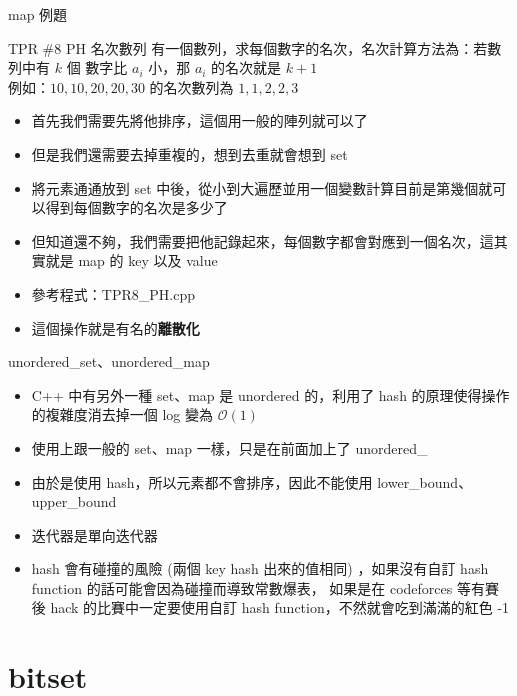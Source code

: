 \documentclass[aspectratio=169]{beamer}
\begin{document}
    
    \begin{frame}{map 例題}
        \begin{block}{TPR \#8 PH 名次數列}
            有一個數列，求每個數字的名次，名次計算方法為：若數列中有 $k$ 個 數字比 $a_i$ 小，那 $a_i$ 的名次就是 $k + 1$\\
            例如：${10, 10, 20, 20, 30}$ 的名次數列為 $1, 1, 2, 2, 3$
        \end{block}

        \begin{itemize}
            \item<2-> 首先我們需要先將他排序，這個用一般的陣列就可以了
            \item<3-> 但是我們還需要去掉重複的，想到去重就會想到 set
            \item<4-> 將元素通通放到 set 中後，從小到大遍歷並用一個變數計算目前是第幾個就可以得到每個數字的名次是多少了
            \item<5-> 但知道還不夠，我們需要把他記錄起來，每個數字都會對應到一個名次，這其實就是 map 的 key 以及 value
            \item<6-> 參考程式：TPR8\_PH.cpp
            \item<6-> 這個操作就是有名的\textbf{離散化}
        \end{itemize}
    \end{frame}

    \begin{frame}{unordered\_set、unordered\_map}
        \begin{itemize}
            \item<1-> C++ 中有另外一種 set、map 是 unordered 的，利用了 hash 的原理使得操作的複雜度消去掉一個 log 變為 $\mathcal{O}(1)$
            \item<1-> 使用上跟一般的 set、map 一樣，只是在前面加上了 unordered\_
            \item<2-> 由於是使用 hash，所以元素都不會排序，因此不能使用 lower\_bound、upper\_bound 
            \item<2-> 迭代器是單向迭代器
            \item<3-> hash 會有碰撞的風險 (兩個 key hash 出來的值相同) ，如果沒有自訂 hash function 的話可能會因為碰撞而導致常數爆表，
            如果是在 codeforces 等有賽後 hack 的比賽中一定要使用自訂 hash function，不然就會吃到滿滿的紅色 -1
        \end{itemize}
    \end{frame}

    \section{bitset}
\end{document}
